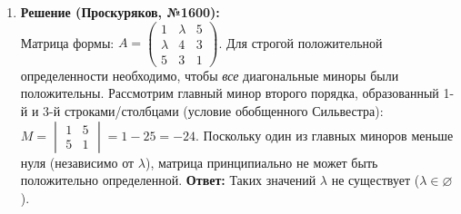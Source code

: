 \begin{enumerate}
    \item \textbf{Решение (Проскуряков, №1600):}\\
    Матрица формы: $A = \begin{pmatrix} 1 & \lambda & 5 \\ \lambda & 4 & 3 \\ 5 & 3 & 1 \end{pmatrix}$.
    Для строгой положительной определенности необходимо, чтобы \textit{все} диагональные миноры были положительны. 
    Рассмотрим главный минор второго порядка, образованный 1-й и 3-й строками/столбцами (условие обобщенного Сильвестра): 
    $M = \begin{vmatrix} 1 & 5 \\ 5 & 1 \end{vmatrix} = 1 - 25 = -24$.
    Поскольку один из главных миноров меньше нуля (независимо от $\lambda$), матрица принципиально не может быть положительно определенной.
    \textbf{Ответ:} Таких значений $\lambda$ не существует ($\lambda \in \varnothing$).

\end{enumerate}
